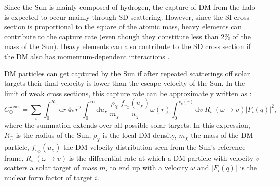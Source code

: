 Since the Sun is mainly composed of hydrogen, the capture of DM from the halo is expected to occur mainly through SD scattering. However, since the SI cross section is proportional to the square of the atomic mass, heavy elements can contribute to the capture rate (even though they constitute less than $2\%$ of the mass of the Sun). Heavy elements can also contribute to the SD cross section if the DM also has momentum-dependent interactions \cite{Catena2015}.

DM particles can get captured by the Sun if after repeated scatterings off solar targets their final velocity is lower than the escape velocity of the Sun. In the limit of weak cross sections, this capture rate can be approximately written as \cite{Gould1987}:
\begin{equation}\label{2.5}
	C_{\odot}^{\mathrm{weak}} = \sum_{i} \int_{0}^{R_{\odot}} \mathrm{d}r \ 4\pi r^{2} \int_{0}^{\infty} \mathrm{d}u_{\chi} \ \frac{\rho_{\chi}}{m_{\chi}} \frac{f_{v_{\odot}}(u_{\chi})}{u_{\chi}} \omega(r) \int_{0}^{v_{e}(r)} \mathrm{d}v \ R_{i}^{-}(\omega \rightarrow v) |F_{i}(q)|^{2},
\end{equation}
where the summation extends over all possible solar targets. In this expression, $R_{\odot}$ is the radius of the Sun, $\rho_{\chi}$ is the local DM density, $m_{\chi}$ the mass of the DM particle, $f_{v_{\odot}}(u_{\chi})$ the DM velocity distribution seen from the Sun's reference frame, $R_{i}^{-}(\omega \rightarrow v)$ is the differential rate at which a DM particle with velocity $v$ scatters a solar target of mass $m_{i}$ to end up with a velocity $\omega$ and $|F_{i}(q)|$ is the nuclear form factor of target $i$.

